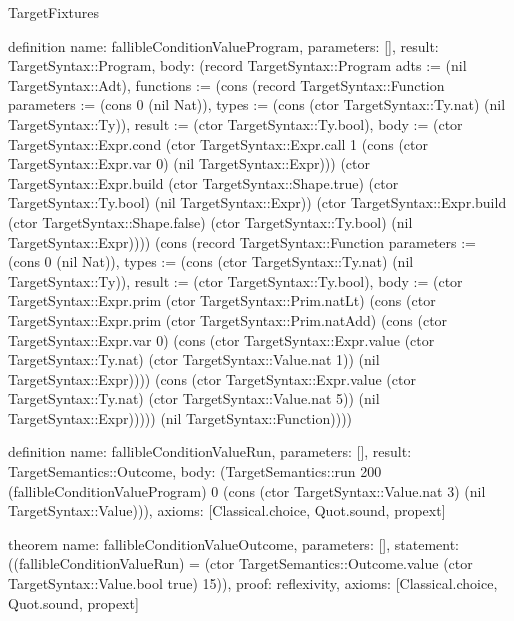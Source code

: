 \begin{lexlean}{TargetFixtures}
\begin{semanticmodule}
definition{
  name: fallibleConditionValueProgram,
  parameters: [],
  result: TargetSyntax::Program,
  body: (record TargetSyntax::Program {adts := (nil TargetSyntax::Adt), functions := (cons (record TargetSyntax::Function {parameters := (cons 0 (nil Nat)), types := (cons (ctor TargetSyntax::Ty.nat) (nil TargetSyntax::Ty)), result := (ctor TargetSyntax::Ty.bool), body := (ctor TargetSyntax::Expr.cond (ctor TargetSyntax::Expr.call 1 (cons (ctor TargetSyntax::Expr.var 0) (nil TargetSyntax::Expr))) (ctor TargetSyntax::Expr.build (ctor TargetSyntax::Shape.true) (ctor TargetSyntax::Ty.bool) (nil TargetSyntax::Expr)) (ctor TargetSyntax::Expr.build (ctor TargetSyntax::Shape.false) (ctor TargetSyntax::Ty.bool) (nil TargetSyntax::Expr)))}) (cons (record TargetSyntax::Function {parameters := (cons 0 (nil Nat)), types := (cons (ctor TargetSyntax::Ty.nat) (nil TargetSyntax::Ty)), result := (ctor TargetSyntax::Ty.bool), body := (ctor TargetSyntax::Expr.prim (ctor TargetSyntax::Prim.natLt) (cons (ctor TargetSyntax::Expr.prim (ctor TargetSyntax::Prim.natAdd) (cons (ctor TargetSyntax::Expr.var 0) (cons (ctor TargetSyntax::Expr.value (ctor TargetSyntax::Ty.nat) (ctor TargetSyntax::Value.nat 1)) (nil TargetSyntax::Expr)))) (cons (ctor TargetSyntax::Expr.value (ctor TargetSyntax::Ty.nat) (ctor TargetSyntax::Value.nat 5)) (nil TargetSyntax::Expr))))}) (nil TargetSyntax::Function)))})
}

definition{
  name: fallibleConditionValueRun,
  parameters: [],
  result: TargetSemantics::Outcome,
  body: (TargetSemantics::run 200 (fallibleConditionValueProgram) 0 (cons (ctor TargetSyntax::Value.nat 3) (nil TargetSyntax::Value))),
  axioms: [Classical.choice, Quot.sound, propext]
}

theorem{
  name: fallibleConditionValueOutcome,
  parameters: [],
  statement: ((fallibleConditionValueRun) = (ctor TargetSemantics::Outcome.value (ctor TargetSyntax::Value.bool true) 15)),
  proof: reflexivity{},
  axioms: [Classical.choice, Quot.sound, propext]
}


\end{semanticmodule}
\end{lexlean}
